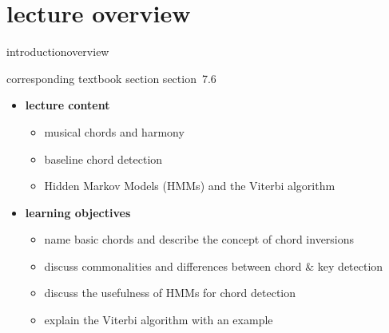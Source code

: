 


\subtitle{Module 7.6: Chord Detection}


	

    \section[overview]{lecture overview}
        \begin{frame}{introduction}{overview}
            \begin{block}{corresponding textbook section}
                    section~7.6
            \end{block}

            \begin{itemize}
                \item   \textbf{lecture content}
                    \begin{itemize}
                        \item   musical chords and harmony
                        \item   baseline chord detection
                        \item   Hidden Markov Models (HMMs) and the Viterbi algorithm
                    \end{itemize}
                \bigskip
                \item<2->   \textbf{learning objectives}
                    \begin{itemize}
                        \item   name basic chords and describe the concept of chord inversions
                        \item   discuss commonalities and differences between chord \& key detection
                        \item   discuss the usefulness of HMMs for chord detection
                        \item   explain the Viterbi algorithm with an example
                    \end{itemize}
            \end{itemize}
        \end{frame}
        
